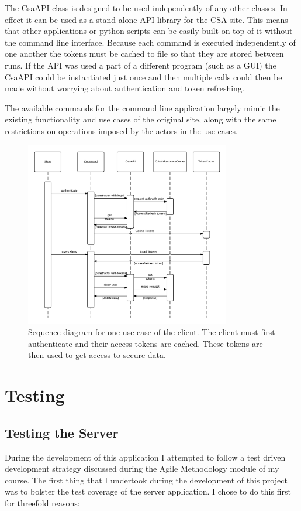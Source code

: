 \documentclass[paper=a4, fontsize=11pt]{scrartcl}	%
\numberwithin{equation}{section}															%
\numberwithin{figure}{section}																%
\numberwithin{table}{section}
\begin{document}
The CsaAPI class is designed to be used independently of any other classes. In effect it can be used as a stand alone API library for the CSA site. This means that other applications or python scripts can be easily built on top of it without the command line interface. Because each command is executed independently of one another the tokens must be cached to file so that they are stored between runs. If the API was used a part of a different program (such as a GUI) the CsaAPI could be instantiated just once and then multiple calls could then be made without worrying about authentication and token refreshing.

The available commands for the command line application largely mimic the existing functionality and use cases of the original site, along with the same restrictions on operations imposed by the actors in the use cases.

\begin{figure}[H]
\centering
\includegraphics[width=0.8\textwidth]{img/client_sequence.png}
\caption{Sequence diagram for one use case of the client. The client must first authenticate and their access tokens are cached. These tokens are then used to get access to secure data.}
\label{fig:client-sequence}
\end{figure}

\section{Testing}
\label{sec:testing}

\subsection{Testing the Server}
\label{subsec:server-testing}
During the development of this application I attempted to follow a test driven development strategy discussed during the Agile Methodology module of my course. The first thing that I undertook during the development of this project was to bolster the test coverage of the server application. I chose to do this first for threefold reasons:
\end{document}
